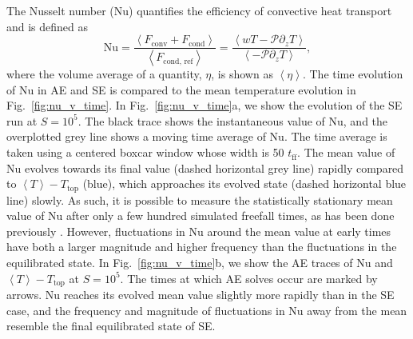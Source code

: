 \documentclass[aps, pre, onecolumn, nofootinbib, notitlepage, groupedaddress, amsfonts, amssymb, amsmath, longbibliography]{revtex4-1}
\newcommand{\angles}[1]{\ensuremath{\left\langle #1 \right\rangle}}
\begin{document}
The Nusselt number (Nu) quantifies the efficiency of convective heat transport
and is defined as
\begin{equation}
\text{Nu} = \frac{\angles{F_{\text{conv}} + F_{\text{cond}}}}{\angles{F_{\text{cond, ref}}}}
 = \frac{\angles{wT - \mathcal{P}\partial_z T}}{\angles{- \mathcal{P} \partial_z T}},
\end{equation}
where the volume average of a quantity, $\eta$, is shown as $\angles{\eta}$.
The time evolution of Nu in AE and SE is compared to the mean temperature evolution
in Fig.~\ref{fig:nu_v_time}. In Fig.~\ref{fig:nu_v_time}a, we show the evolution
of the SE run at $S = 10^5$. The black trace shows the instantaneous value of
Nu, and the overplotted grey line shows a moving time average of Nu. The
time average is taken using a centered boxcar window whose width is 50 $t_{\text{ff}}$.
The mean value of Nu evolves towards its final value (dashed horizontal
grey line) rapidly compared to $\angles{T}-T_{\text{top}}$ (blue), 
which approaches its evolved state (dashed horizontal blue line) slowly.
As such, it is possible to measure the statistically stationary mean value of
Nu after only a few hundred simulated freefall times, 
as has been done previously \cite{stevens&all2010}. However, fluctuations in
Nu around the mean value at early times have both a larger magnitude and higher
frequency than the fluctuations in the equilibrated state.
In Fig.~\ref{fig:nu_v_time}b, we show the AE traces of Nu and
$\angles{T}-T_{\text{top}}$ at $S = 10^5$. The times at which AE solves occur are marked
by arrows. Nu reaches its evolved mean value slightly more rapidly than in the SE case,
and the frequency and magnitude of fluctuations in Nu away from the mean resemble the
final equilibrated state of SE.
\end{document}

